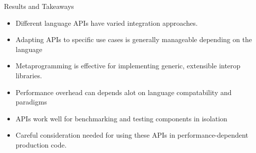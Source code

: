 \begin{frame}{Results and Takeaways}
    \begin{itemize}
        \item Different language APIs have varied integration approaches.
        \item Adapting APIs to specific use cases is generally manageable depending on the language
        \item Metaprogramming is effective for implementing generic, extensible interop libraries.
        \item Performance overhead can depends alot on language compatability and paradigms
        \item APIs work well for benchmarking and testing components in isolation
        \item Careful consideration needed for using these APIs in performance-dependent production code.
    \end{itemize}
\end{frame}